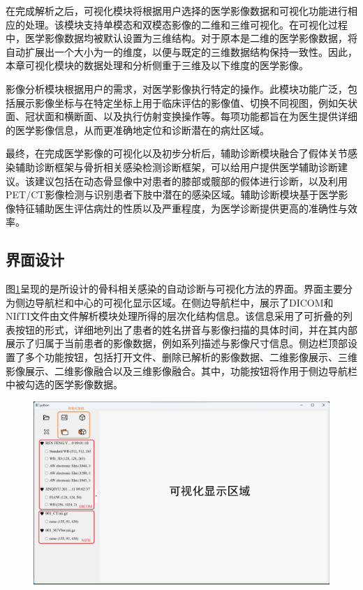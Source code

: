 在完成解析之后，可视化模块将根据用户选择的医学影像数据和可视化功能进行相应的处理。该模块支持单模态和双模态影像的二维和三维可视化。在可视化过程中，医学影像数据均被默认设置为三维结构。对于原本是二维的医学影像数据，将自动扩展出一个大小为一的维度，以便与既定的三维数据结构保持一致性。因此，本章可视化模块的数据处理和分析侧重于三维及以下维度的医学影像。

影像分析模块根据用户的需求，对医学影像执行特定的操作。此模块功能广泛，包括展示影像坐标与在特定坐标上用于临床评估的影像值、切换不同视图，例如矢状面、冠状面和横断面、以及执行仿射变换操作等。每项功能都旨在为医生提供详细的医学影像信息，从而更准确地定位和诊断潜在的病灶区域。

最终，在完成医学影像的可视化以及初步分析后，辅助诊断模块融合了假体关节感染辅助诊断框架与骨折相关感染检测诊断框架，可以给用户提供医学辅助诊断建议。该建议包括在动态骨显像中对患者的膝部或髋部的假体进行诊断，以及利用PET/CT影像检测与识别患者下肢中潜在的感染区域。辅助诊断模块基于医学影像特征辅助医生评估病灶的性质以及严重程度，为医学诊断提供更高的准确性与效率。

\subsection{界面设计}

图\ref{fig:chap05_preview}呈现的是所设计的骨科相关感染的自动诊断与可视化方法的界面。界面主要分为侧边导航栏和中心的可视化显示区域。在侧边导航栏中，展示了DICOM和NIfTI文件由文件解析模块处理所得的层次化结构信息。该信息采用了可折叠的列表按钮的形式，详细地列出了患者的姓名拼音与影像扫描的具体时间，并在其内部展示了归属于当前患者的影像数据，例如系列描述与影像尺寸信息。侧边栏顶部设置了多个功能按钮，包括打开文件、删除已解析的影像数据、二维影像展示、三维影像展示、二维影像融合以及三维影像融合。其中，功能按钮将作用于侧边导航栏中被勾选的医学影像数据。

\begin{figure}[htbp]
  \centering
  \includegraphics[width=\textwidth]{figures/chap05_preview.jpg}
  \label{fig:chap05_preview}
\end{figure}

